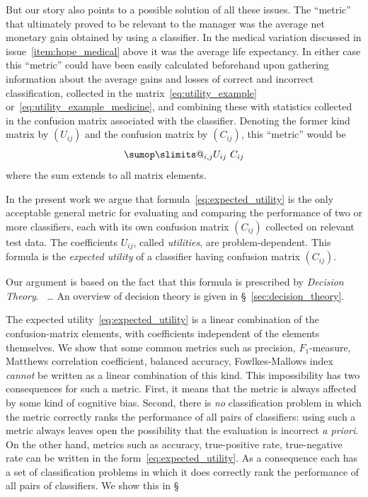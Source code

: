 \documentclass[\ifafour a4paper,12pt,\else a5paper,10pt,\fi%
onecolumn,oneside,article,%
british%
]{memoir}
\makeatletter
\theoremstyle{remark}
\theoremstyle{innote}
\def\sum{\DOTSI\sumop\slimits@}
\renewcommand*{\|}[1][]{\nonscript\:#1\vert\nonscript\:\mathopen{}}
\newcommand*{\sect}{\S}%
\newcommand*{\wrench}{{\fontencoding{U}\fontfamily{fontawesomethree}\selectfont\symbol{114}}}
\newcommand*{\pencil}{{\fontencoding{U}\fontfamily{fontawesometwo}\selectfont\symbol{210}}}
\newcommand{\mynotew}[1]{{\footnotesize\color{notecolour}\wrench\ #1}}
\newcommand{\mynotep}[1]{{\footnotesize\color{notecolour}\pencil\ #1}}
\makeatother
\begin{document}
\bigskip

But our story also points to a possible solution of all these issues. The \enquote{metric} that ultimately proved to be relevant to the manager was the average net monetary gain obtained by using a classifier. In the medical variation discussed in issue~\ref{item:hope_medical} above it was the average life expectancy.  In either case this \enquote{metric} could have been easily calculated beforehand upon gathering information about the average gains and losses of correct and incorrect classification, collected in the matrix~\eqref{eq:utility_example} or~\eqref{eq:utility_example_medicine}, and combining these with statistics collected in the confusion matrix associated with the classifier. Denoting the former kind matrix by $(U_{ij})$ and the confusion matrix by $(C_{ij})$, this \enquote{metric} would be
\begin{equation}
  \label{eq:expected_utility}
  \sum_{i,j} U_{ij}\ C_{ij} 
\end{equation}
where the sum extends to all matrix elements.

\medskip

In the present work we argue that formula~\eqref{eq:expected_utility} is the only acceptable general metric for evaluating and comparing the performance of two or more classifiers, each with its own confusion matrix $(C_{ij})$ collected on relevant test data. The coefficients $U_{ij}$, called \emph{utilities}, are problem-dependent. This formula is the \emph{expected utility} of a classifier having confusion matrix $(C_{ij})$.

Our argument is based on the fact that this formula is prescribed by \emph{Decision Theory}. \mynotep{\ldots} An overview of decision theory is given in \sect~\ref{sec:decision_theory}.

The expected utility~\eqref{eq:expected_utility} is a linear combination of the confusion-matrix elements, with coefficients independent of the elements themselves. We show that some common metrics such as precision, $F_{1}$-measure, Matthews correlation coefficient, balanced accuracy, Fowlkes-Mallows index \emph{cannot} be written as a linear combination of this kind. This impossibility has two consequences for such a metric. First, it means that the metric is always affected by some kind of cognitive bias. Second, there is \emph{no} classification problem in which the metric correctly ranks the performance of all pairs of classifiers: using such a metric always leaves open the possibility that the evaluation is incorrect \emph{a priori}. On the other hand, metrics such as accuracy, true-positive rate, true-negative rate can be written in the form~\eqref{eq:expected_utility}. As a consequence each has a set of classification problems in which it does correctly rank the performance of all pairs of classifiers. We show this in \sect\mynotew{}
\end{document}
